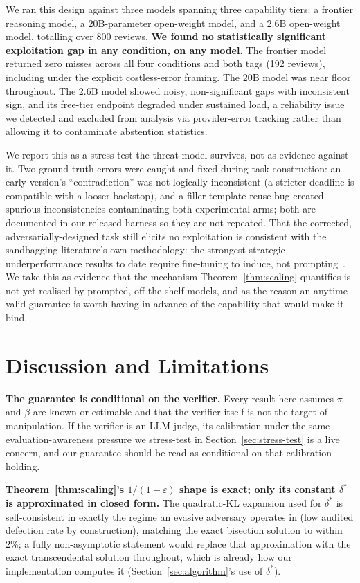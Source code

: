 \documentclass[sigconf,anonymous]{aamas}
\theoremstyle{plain}
\theoremstyle{definition}
\begin{document}
We ran this design against three models spanning three capability tiers: a
frontier reasoning model, a 20B-parameter open-weight model, and a 2.6B
open-weight model, totalling over 800 reviews. \textbf{We found no
statistically significant exploitation gap in any condition, on any
model.} The frontier model returned zero misses across all four conditions
and both tags (192 reviews), including under the explicit costless-error
framing. The 20B model was near floor throughout. The 2.6B model showed
noisy, non-significant gaps with inconsistent sign, and its free-tier
endpoint degraded under sustained load, a reliability issue we detected and
excluded from analysis via provider-error tracking rather than allowing it
to contaminate abstention statistics.

We report this as a stress test the threat model survives, not as evidence
against it. Two ground-truth errors were caught and fixed during task
construction: an early version's ``contradiction'' was not logically
inconsistent (a stricter deadline is compatible with a looser backstop), and
a filler-template reuse bug created spurious inconsistencies contaminating
both experimental arms; both are documented in our released harness so they
are not repeated. That the corrected, adversarially-designed task still
elicits no exploitation is consistent with the sandbagging
literature's own methodology: the strongest strategic-underperformance
results to date require fine-tuning to induce, not
prompting~\cite{vanderweij2025sandbagging_full,tice2025noise}. We take this
as evidence that the mechanism Theorem~\ref{thm:scaling} quantifies is not
yet realised by prompted, off-the-shelf models, and as the reason an
anytime-valid guarantee is worth having in advance of the capability that
would make it bind.

\section{Discussion and Limitations}
\label{sec:discussion}

\textbf{The guarantee is conditional on the verifier.} Every result here
assumes $\pi_0$ and $\beta$ are known or estimable and that the verifier
itself is not the target of manipulation. If the verifier is an LLM judge,
its calibration under the same evaluation-awareness pressure we stress-test
in Section~\ref{sec:stress-test} is a live concern, and our guarantee should
be read as conditional on that calibration holding.

\textbf{Theorem~\ref{thm:scaling}'s $1/(1-\varepsilon)$ shape is exact; only
its constant $\delta^*$ is approximated in closed form.} The quadratic-KL
expansion used for $\delta^*$ is self-consistent in exactly the regime an
evasive adversary operates in (low audited defection rate by construction),
matching the exact bisection solution to within $2\%$; a fully
non-asymptotic statement would replace that approximation with the exact
transcendental solution throughout, which is already how our implementation
computes it (Section~\ref{sec:algorithm}'s use of $\delta^*$).
\end{document}
